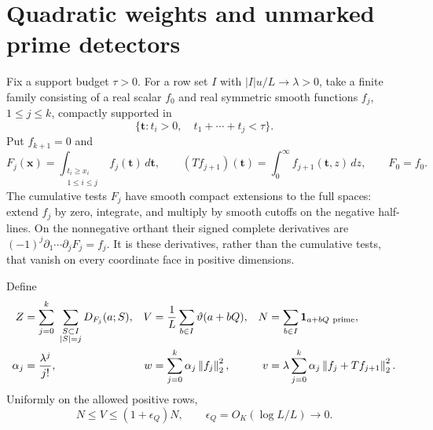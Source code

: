 \documentclass[11pt]{article}
\theoremstyle{remark}
\numberwithin{equation}{section}
\newcommand{\ind}{\mathbf 1}
\newcommand{\norm}[1]{\left\lVert#1\right\rVert}
\begin{document}
\section{Quadratic weights and unmarked prime detectors}\label{sec:forms}

Fix a support budget $\tau>0$. For a row set $I$ with
$|I|u/L\to\lambda>0$, take a finite family consisting of a real
scalar $f_0$ and real symmetric smooth functions $f_j$,
$1\le j\le k$, compactly supported in
\[
 \{\mathbf t:t_i>0,\quad t_1+\cdots+t_j<\tau\}.
\]
Put $f_{k+1}=0$ and
\[
 F_j(\mathbf x)=\int_{\substack{t_i\ge x_i\\1\le i\le j}}
                     f_j(\mathbf t)\,d\mathbf t,
 \qquad
 (Tf_{j+1})(\mathbf t)=\int_0^\infty f_{j+1}(\mathbf t,z)\,dz,
 \qquad F_0=f_0 .
\]
The cumulative tests $F_j$ have smooth compact extensions to the
full spaces: extend $f_j$ by zero, integrate, and multiply by
smooth cutoffs on the negative half-lines. On the nonnegative
orthant their signed complete derivatives are
$(-1)^j\partial_1\cdots\partial_jF_j=f_j$.
It is these derivatives, rather than the cumulative tests, that
vanish on every coordinate face in positive dimensions.

Define
\begin{align}
 Z&=\sum_{j=0}^k\ \sum_{\substack{S\subset I\\|S|=j}}
          D_{F_j}(a;S),&
 V&=\frac1L\sum_{b\in I}\vartheta(a+bQ),&
 N&=\sum_{b\in I}\ind_{a+bQ\ {\rm prime}},\label{eq:ZVN}\\
 \alpha_j&=\frac{\lambda^j}{j!},&
 w&=\sum_{j=0}^k\alpha_j\norm{f_j}_2^2,&
 v&=\lambda\sum_{j=0}^k\alpha_j\norm{f_j+Tf_{j+1}}_2^2.
 \label{eq:wv}
\end{align}
Uniformly on the allowed positive rows,
\begin{equation}\label{eq:NV}
 N\le V\le(1+\epsilon_Q)N,\qquad
 \epsilon_Q=O_K(\log L/L)\longrightarrow0.
\end{equation}
\end{document}
